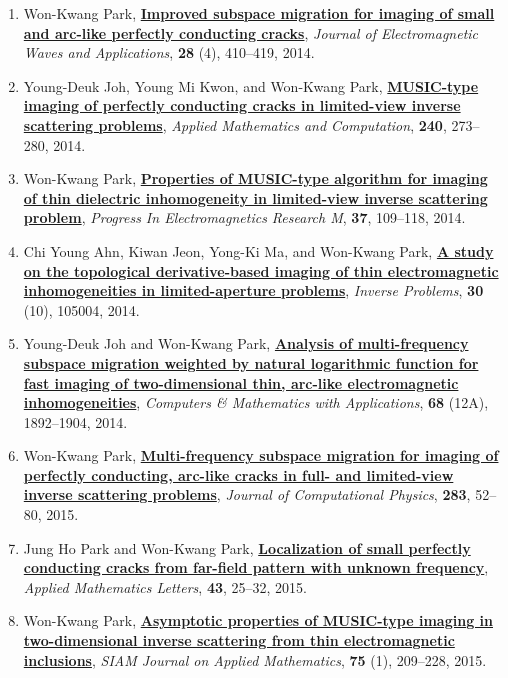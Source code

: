 \documentclass[10pt,A4]{article}
\begin{document}
\begin{enumerate}
\item\label{A-JEMEA2014} Won-Kwang Park, \href{http://dx.doi.org/10.1080/09205071.2013.866526}{\textbf{Improved subspace migration for imaging of small and arc-like perfectly conducting cracks}}, \textit{Journal of Electromagnetic Waves and Applications}, \textbf{28} (4), 410--419, 2014.
\item\label{A-AMC2014} Young-Deuk Joh, Young Mi Kwon, and Won-Kwang Park, \href{http://dx.doi.org/10.1016/j.amc.2014.04.097}{\textbf{MUSIC-type imaging of perfectly conducting cracks in limited-view inverse scattering problems}}, \textit{Applied Mathematics and Computation}, \textbf{240}, 273--280, 2014.
\item\label{A-PIERM2014} Won-Kwang Park, \href{http://dx.doi.org/10.2528/PIERM14050403}{\textbf{Properties of MUSIC-type algorithm for imaging of thin dielectric inhomogeneity in limited-view inverse scattering problem}}, \textit{Progress In Electromagnetics Research M}, \textbf{37}, 109--118, 2014.
\item\label{A-IP2014} Chi Young Ahn, Kiwan Jeon, Yong-Ki Ma, and Won-Kwang Park, \href{http://dx.doi.org/10.1088/0266-5611/30/10/105004}{\textbf{A study on the topological derivative-based imaging of thin electromagnetic inhomogeneities in limited-aperture problems}}, \textit{Inverse Problems}, \textbf{30} (10), 105004, 2014.
\item\label{A-CAMWA2014} Young-Deuk Joh and Won-Kwang Park, \href{http://dx.doi.org/10.1016/j.camwa.2014.10.005}{\textbf{Analysis of multi-frequency subspace migration weighted by natural logarithmic function for fast imaging of two-dimensional thin, arc-like electromagnetic inhomogeneities}}, \textit{Computers \& Mathematics with Applications}, \textbf{68} (12A), 1892--1904, 2014.
\item\label{A-JCOMP2015A} Won-Kwang Park, \href{http://dx.doi.org/10.1016/j.jcp.2014.11.036}{\textbf{Multi-frequency subspace migration for imaging of perfectly conducting, arc-like cracks in full- and limited-view inverse scattering problems}}, \textit{Journal of Computational Physics}, \textbf{283}, 52--80, 2015.
\item\label{A-AML2015} Jung Ho Park and Won-Kwang Park, \href{http://dx.doi.org/10.1016/j.aml.2014.11.008}{\textbf{Localization of small perfectly conducting cracks from far-field pattern with unknown frequency}}, \textit{Applied Mathematics Letters}, \textbf{43}, 25--32, 2015.
\item\label{A-SIAP2015} Won-Kwang Park, \href{http://dx.doi.org/10.1137/140975176}{\textbf{Asymptotic properties of MUSIC-type imaging in two-dimensional inverse scattering from thin electromagnetic inclusions}}, \textit{SIAM Journal on Applied Mathematics}, \textbf{75} (1), 209--228, 2015.

\end{enumerate}
\end{document}

